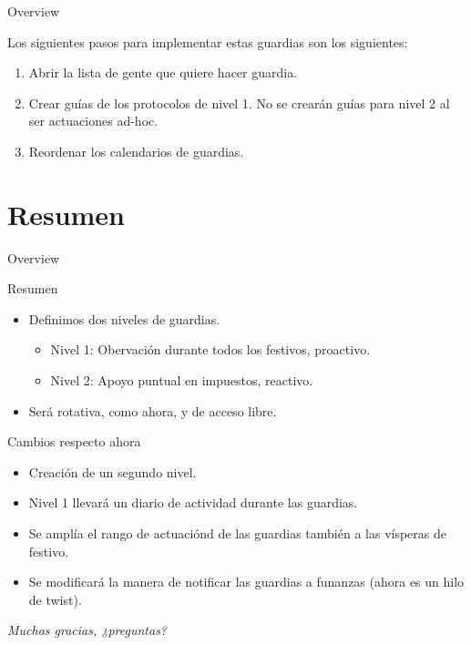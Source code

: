 \documentclass[12pt, aspectratio=169]{beamer} %
\begin{document}
\begin{frame}{Overview}
\tableofcontents
\end{frame}


\begin{frame}
  Los siguientes pasos para implementar estas guardias son los siguientes:
  \begin{enumerate}
  \item Abrir la lista de gente que quiere hacer guardia.
  \item Crear guías de los protocolos de nivel 1. No se crearán guías para nivel 2 al ser actuaciones ad-hoc.
  \item Reordenar los calendarios de guardias.
  \end{enumerate}
\end{frame}

\section{Resumen}

\begin{frame}{Overview}
\tableofcontents
\end{frame}


\begin{frame}{Resumen}
  \begin{itemize}
  \item Definimos dos niveles de guardias.
    \begin{itemize}
    \item Nivel 1: Obervación durante todos los festivos, proactivo.
    \item Nivel 2: Apoyo puntual en impuestos, reactivo.
    \end{itemize}
  \item Será rotativa, como ahora, y de acceso libre.
  \end{itemize}

  \begin{block}{Cambios respecto ahora}
    \begin{itemize}
    \item Creación de un segundo nivel.
    \item Nivel 1 llevará un diario de actividad durante las guardias.
    \item Se amplía el rango de actuaciónd de las guardias también a las vísperas de festivo.
    \item Se modificará la manera de notificar las guardias a funanzas (ahora es un hilo de twist).
    \end{itemize}

  \end{block}
  
\end{frame}


\begin{frame}{}
  \centering \Large
  \emph{Muchas gracias, ¿preguntas?}
\end{frame}





\end{document}
